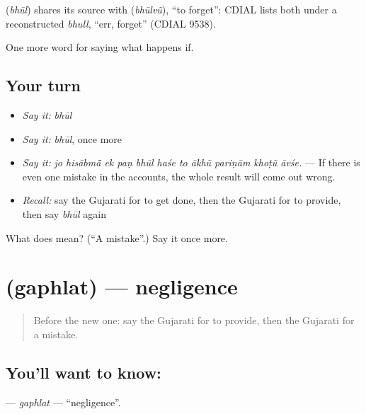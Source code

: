 \begin{cousinweb}
\textbf{} (\emph{bhūl}) shares its source with \textbf{} (\emph{bhūlvũ}), \textquotedblleft{}to forget\textquotedblright{}: CDIAL lists both under a reconstructed \emph{bhull}, \textquotedblleft{}err, forget\textquotedblright{} (CDIAL 9538).
\end{cousinweb}

\begin{grammarlens}[title={What you've built}]
One more word for saying what happens if.
\end{grammarlens}

\subsection*{Your turn}
\begin{itemize}
\raggedright
  \item \emph{Say it:} \emph{bhūl}
  \item \emph{Say it:} \emph{bhūl}, once more
  \item \emph{Say it:} \emph{jo hisābmā̃ ek paṇ bhūl haśe to ākhũ pariṇām khoṭũ āvśe.} — If there is even one mistake in the accounts, the whole result will come out wrong.
  \item \emph{Recall:} say the Gujarati for to get done, then the Gujarati for to provide, then say \emph{bhūl} again
\end{itemize}

\begin{tcolorbox}[breakable,colback=teal!4,colframe=teal!35!black,title={Before you move on}]
What does  mean? (\textquotedblleft{}A mistake\textquotedblright{}.) Say it once more.
\end{tcolorbox}
\section[\texorpdfstring{\gu{ગફલત} (gaphlat)}{ગફલત (gaphlat)}]{ (gaphlat) — negligence}

\label{lesson:GU-C376-gaphlat}



\begin{quote}
Before the new one: say the Gujarati for to provide, then the Gujarati for a mistake.
\end{quote}

\subsection*{You'll want to know: }
\textbf{} — \emph{gaphlat} — \textquotedblleft{}negligence\textquotedblright{}.

